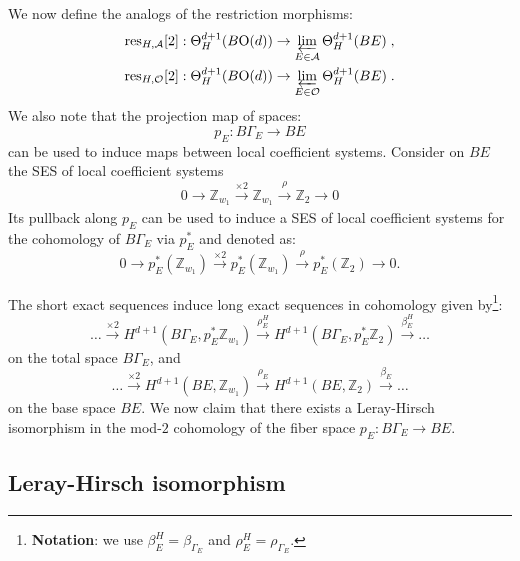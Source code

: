 \documentclass[aps,prx,reprint,superscriptaddress,twocolumn,amsmath,amssymb,amsfonts, nofootinbib]{revtex4-2}
\newcommand{\res}{\text{res}}
\newcommand{\Z}{\mathbb{Z}}
\theoremstyle{apsstyle}
\begin{document}
\noindent We now define the analogs of the restriction morphisms: 
\begin{gather}
\label{eq:internal_resA}
\res_{H,\mathcal{A}}[2]: \Theta^{d+1}_{H}(B\mathrm{O}(d)) \to \varprojlim_{E\in \mathcal{A}} \Theta^{d+1}_{H}(BE)\;,\\
\res_{H,\mathcal{O}}[2]: \Theta^{d+1}_{H}(B\mathrm{O}(d)) \to \varprojlim_{E\in \mathcal{O}} \Theta^{d+1}_{H}(BE)\;.
\label{eq:internal_resO}
\end{gather}
We also note that the projection map of spaces: 
\begin{equation*}
p_{E}: B\Gamma_{E} \to BE
\end{equation*}
can be used to induce maps between local coefficient systems. Consider on $BE$ the SES of local coefficient systems 
\begin{equation*}
    0\to \mathbb{Z}_{w_{1}} \xrightarrow[]{\times 2} \mathbb{Z}_{w_{1}} \xrightarrow[]{\rho} \mathbb{Z}_{2} \to 0   
\end{equation*}
Its pullback along $p_{E}$ can be used to induce a SES of local coefficient systems for the cohomology of $B\Gamma_{E}$ via $p_{E}^{*}$ and denoted as: 
\begin{equation}
\label{eq:coeff_pullback}
0\to p_{E}^{*}(\mathbb{Z}_{w_{1}}) \xrightarrow[]{\times 2} p_{E}^{*}(\mathbb{Z}_{w_{1}}) \xrightarrow[]{\rho} p_{E}^{*}(\mathbb{Z}_{2})\to 0.
\end{equation}

\noindent The short exact sequences induce long exact sequences in cohomology given by\footnote{{\bf Notation}: we use $\beta_{E}^{H}=\beta_{\Gamma_{E}}$ and $\rho_{E}^{H}=\rho_{\Gamma_{E}}$.}: 
\begin{equation*}
    \dots \xrightarrow[]{\times 2} H^{d+1}(B\Gamma_{E}, p_{E}^{*}\Z_{w_{1}}) \xrightarrow[]{\rho_{E}^{H}} H^{d+1}(B\Gamma_{E}, p_{E}^{*}\Z_{2}) \xrightarrow[]{\beta^{H}_{E}} \dots
\end{equation*}
on the total space $B\Gamma_{E}$, and 
\begin{equation*}
    \dots \xrightarrow[]{\times 2} H^{d+1}(BE, \Z_{w_{1}}) \xrightarrow[]{\rho_{E}} H^{d+1}(BE, \Z_{2}) \xrightarrow[]{\beta_{E}} \dots
\end{equation*}
on the base space $BE$. We now claim that there exists a Leray-Hirsch isomorphism in the mod-$2$ cohomology of the fiber space $p_{E}: B\Gamma_{E}\to BE$. 

\subsection{Leray-Hirsch isomorphism}
\label{app:leray_hirsch}
\end{document}
